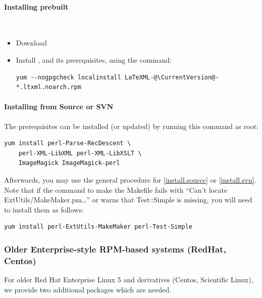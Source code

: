 \documentclass{article}
\begin{document}
\paragraph{Installing prebuilt}\\
\begin{itemize}
\item Download \CurrentFedora
\item Install \LaTeXML, and its prerequisites, using the command:
\begin{lstlisting}[style=shell]
   yum --nogpgcheck localinstall LaTeXML-@\CurrentVersion@-*.ltxml.noarch.rpm
\end{lstlisting}
\end{itemize}

\paragraph{Installing from Source or SVN}
The prerequisites can be installed (or updated) by running this command as root: 
\begin{lstlisting}[style=shell]
yum install perl-Parse-RecDescent \
    perl-XML-LibXML perl-XML-LibXSLT \
    ImageMagick ImageMagick-perl
\end{lstlisting}
Afterwards, you may use the general procedure for
\ref{install.source} or \ref{install.svn}.
Note that if the command to make the Makefile fails with
``Can't locate ExtUtils/MakeMaker.pm\ldots'' or warns that Test::Simple is missing,
you will need to install them as follows:
\begin{lstlisting}[style=shell]
yum install perl-ExtUtils-MakeMaker perl-Test-Simple
\end{lstlisting}


\subsubsection[Older Enterprise systems]{Older Enterprise-style RPM-based systems (RedHat, Centos)}\label{install.enterprise}
For older Red Hat Enterprise Linux 5 and derivatives (Centos, Scientific Linux),
we provide two additional packages which are needed.
\end{document}
